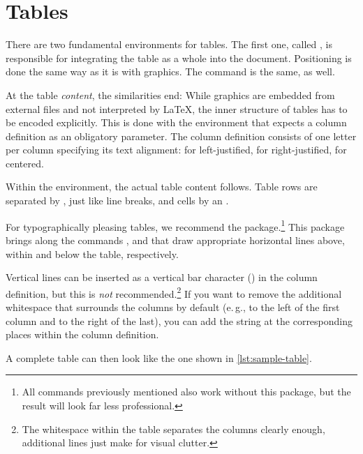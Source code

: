 \chapter{Tables}
\label{sec:tables}

There are two fundamental environments for tables.
The first one, called , is responsible for integrating the table as a whole into the document.
Positioning is done the same way as it is with graphics.
The  command is the same, as well.

At the table \emph{content}, the similarities end:
While graphics are embedded from external files and not interpreted by \LaTeX{},
the inner structure of tables has to be encoded explicitly.
This is done with the  environment that expects a column definition as an obligatory parameter.
The column definition consists of one letter per column specifying its text alignment:
 for left-justified,  for right-justified,  for centered.

Within the  environment, the actual table content follows.
Table rows are separated by , just like line breaks, and cells by an .

For typographically pleasing tables, we recommend the  package.\footnote{All commands previously mentioned also work without this package, but the result will look far less professional.}
This package brings along the commands ,  and  that draw appropriate horizontal lines above, within and below the table, respectively.

Vertical lines can be inserted as a vertical bar character (\mono{|}) in the column definition, but this is \emph{not} recommended.\footnote{The
whitespace within the table separates the columns clearly enough, additional lines just make for visual clutter.}
If you want to remove the additional whitespace that surrounds the columns by default (e.\,g., to the left of the first column and to the right of the last), you can add the string  at the corresponding places within the column definition.

A complete table can then look like the one shown in \cref{lst:sample-table}.


